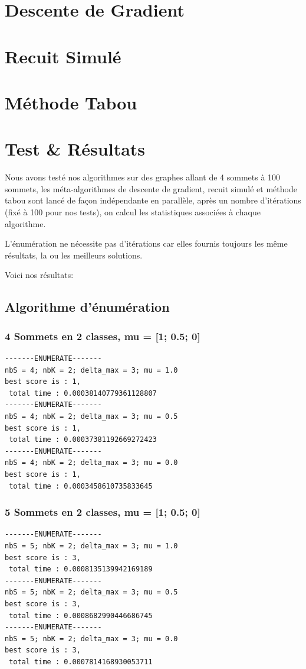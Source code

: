 \documentclass[a4paper]{article}
\begin{document}
\section{Descente de Gradient}

\section{Recuit Simulé}

\section{Méthode Tabou}

\section{Test \& Résultats}

Nous avons testé nos algorithmes sur des graphes allant de 4 sommets à 100 sommets, les méta-algorithmes de descente de gradient, recuit simulé et méthode tabou sont lancé de façon indépendante en parallèle, après un nombre d'itérations (fixé à 100 pour nos tests), on calcul les statistiques associées à chaque algorithme.

L'énumération ne nécessite pas d'itérations car elles fournis toujours les même résultats, la ou les meilleurs solutions.

Voici nos résultats:

\subsection{Algorithme d'énumération}
\subsubsection{4 Sommets en 2 classes, mu = [1; 0.5; 0]}
\begin{verbatim}
-------ENUMERATE-------
nbS = 4; nbK = 2; delta_max = 3; mu = 1.0
best score is : 1,
 total time : 0.00038140779361128807
-------ENUMERATE-------
nbS = 4; nbK = 2; delta_max = 3; mu = 0.5
best score is : 1,
 total time : 0.00037381192669272423
-------ENUMERATE-------
nbS = 4; nbK = 2; delta_max = 3; mu = 0.0
best score is : 1,
 total time : 0.0003458610735833645
\end{verbatim}
\subsubsection{5 Sommets en 2 classes, mu = [1; 0.5; 0]}
\begin{verbatim}
-------ENUMERATE-------
nbS = 5; nbK = 2; delta_max = 3; mu = 1.0
best score is : 3,
 total time : 0.0008135139942169189
-------ENUMERATE-------
nbS = 5; nbK = 2; delta_max = 3; mu = 0.5
best score is : 3,
 total time : 0.0008682990446686745
-------ENUMERATE-------
nbS = 5; nbK = 2; delta_max = 3; mu = 0.0
best score is : 3,
 total time : 0.0007814168930053711
\end{verbatim}
\end{document}
